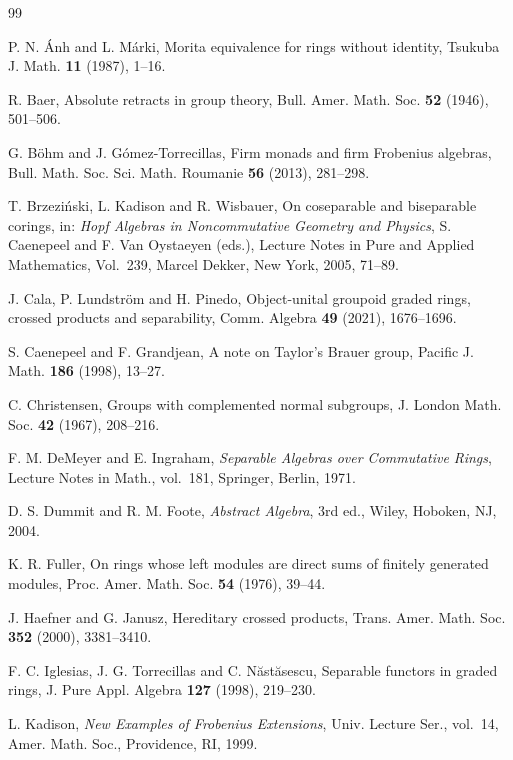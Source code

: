 \documentclass[12pt]{amsart}
\theoremstyle{definition}
\begin{document}
\begin{thebibliography}{99}

P. N. \'Anh and L. M\'arki,
Morita equivalence for rings without identity,
Tsukuba J. Math. \textbf{11} (1987), 1--16.

R. Baer,
Absolute retracts in group theory,
Bull. Amer. Math. Soc. \textbf{52} (1946), 501--506.

G. B\"ohm and J. G\'omez-Torrecillas,
Firm monads and firm Frobenius algebras,
Bull. Math. Soc. Sci. Math. Roumanie \textbf{56} (2013), 281--298.

T. Brzezi\'nski, L. Kadison and R. Wisbauer,
On coseparable and biseparable corings,
in: \emph{Hopf Algebras in Noncommutative Geometry and Physics},
S. Caenepeel and F. Van Oystaeyen (eds.),
Lecture Notes in Pure and Applied Mathematics, Vol.~239,
Marcel Dekker, New York, 2005, 71--89.

J. Cala, P. Lundstr\"om and H. Pinedo,
Object-unital groupoid graded rings, crossed products and separability,
Comm. Algebra \textbf{49} (2021), 1676--1696.

S. Caenepeel and F. Grandjean,
A note on Taylor's Brauer group,
Pacific J. Math. \textbf{186} (1998), 13--27.

C. Christensen,
Groups with complemented normal subgroups,
J. London Math. Soc. \textbf{42} (1967), 208--216.

F. M. DeMeyer and E. Ingraham,
\emph{Separable Algebras over Commutative Rings},
Lecture Notes in Math., vol.~181, Springer, Berlin, 1971.

D. S. Dummit and R. M. Foote,
\emph{Abstract Algebra},
3rd ed., Wiley, Hoboken, NJ, 2004.

K. R. Fuller,
On rings whose left modules are direct sums of finitely generated modules,
Proc. Amer. Math. Soc. \textbf{54} (1976), 39--44.

J. Haefner and G. Janusz,
Hereditary crossed products,
Trans. Amer. Math. Soc. \textbf{352} (2000), 3381--3410.

F. C. Iglesias, J. G. Torrecillas and C. N\u{a}st\u{a}sescu,
Separable functors in graded rings,
J. Pure Appl. Algebra \textbf{127} (1998), 219--230.

L. Kadison,
\emph{New Examples of Frobenius Extensions},
Univ. Lecture Ser., vol.~14, Amer. Math. Soc., Providence, RI, 1999.


\end{thebibliography}
\end{document}
